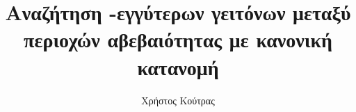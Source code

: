 \documentclass[11pt,a4paper,english,greek,twoside]{dblab-thesis}
\title{Αναζήτηση \textit{\tl{k}}-εγγύτερων γειτόνων μεταξύ περιοχών αβεβαιότητας με κανονική κατανομή}
\author{Χρήστος Κούτρας}
\begin{document}
\maketitle

\frontmatter
{}
\mainmatter

\tableofcontents
\listoffigures
\listoftables

\clearpage
\renewcommand\lstlistlistingname{Κατάλογος Παραθέσεων}
\renewcommand\lstlistingname{\selectlanguage{greek}Παράθεση}
\lstlistoflistings














%


%



\backmatter
\printindex
\end{document}
